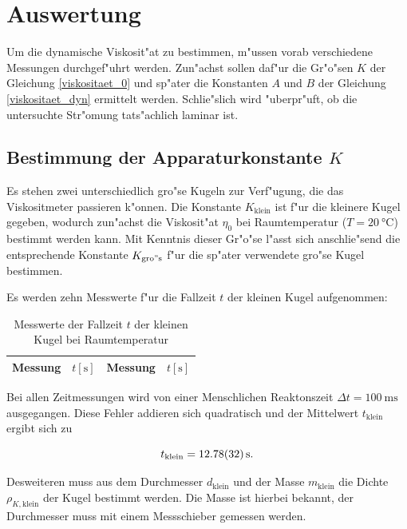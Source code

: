 \clearpage
\newpage
\section{Auswertung}
	\label{sec:auswertung}

	Um die dynamische Viskosit"at zu bestimmen, m"ussen vorab verschiedene Messungen durchgef"uhrt werden.
	Zun"achst sollen daf"ur die Gr"o"sen $K$ der Gleichung \eqref{viskositaet_0} und sp"ater die Konstanten $A$ und $B$ der Gleichung \eqref{viskositaet_dyn} ermittelt werden.
	Schlie"slich wird "uberpr"uft, ob die untersuchte Str"omung tats"achlich laminar ist.

	\subsection{Bestimmung der Apparaturkonstante $K$} %
		\label{sub:bestimmung_k}

		Es stehen zwei unterschiedlich gro"se Kugeln zur Verf"ugung, die das Viskositmeter pas\-sie\-ren k"onnen.
		Die Konstante $K_\mathrm{klein}$ ist f"ur die kleinere Kugel gegeben, wodurch zun"achst die Viskosit"at $\eta_0$ bei Raumtemperatur ($T = \SI{20}{\celsius}$) bestimmt werden kann.
		Mit Kenntnis dieser Gr"o"se l"asst sich anschlie"send die entsprechende Konstante $K_\mathrm{gro"s}$ f"ur die sp"ater ver\-wen\-de\-te gro"se Kugel bestimmen.

		Es werden zehn Messwerte f"ur die Fallzeit $t$ der kleinen Kugel aufgenommen:

		\begin{table}[h!]
			\centering
			\caption{Messwerte der Fallzeit $t$ der kleinen Kugel bei Raumtemperatur}
			\begin{tabular}{|c|c||c|c|}
				\hline
				Messung & $t [\mathrm{s}]$ & Messung & $t [\mathrm{s}]$ \\
				\hline
				\hline
				
				\hline
			\end{tabular}
		\end{table}

		Bei allen Zeitmessungen wird von einer Menschlichen Reaktonszeit $\Delta t = \SI{100}{\milli \second}$ aus\-ge\-gan\-gen.
		Diese Fehler addieren sich quadratisch und der Mittelwert $t_\mathrm{klein}$ ergibt sich zu

		\begin{equation*}
			t_\mathrm{klein} = \SI{12.78 (32)}{\second} .
		\end{equation*}

		Desweiteren muss aus dem Durchmesser $d_\mathrm{klein}$ und der Masse $m_\mathrm{klein}$ die Dichte $\rho_{K,\mathrm{klein}}$ der Kugel bestimmt werden. Die Masse ist hierbei bekannt, der Durchmesser muss mit einem Messschieber gemessen werden.


